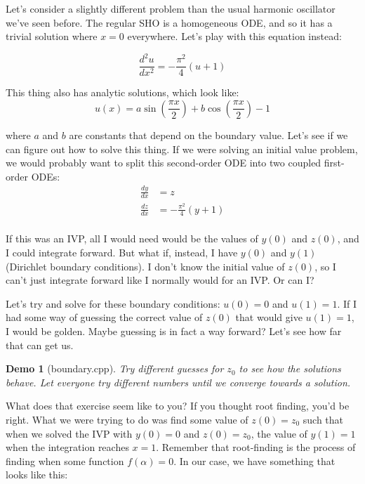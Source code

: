 \documentclass{article}
\theoremstyle{demo}
\newtheorem{demo}{Demo}[section]
\begin{document}
Let's consider a slightly different problem than the usual harmonic oscillator
we've seen before.  The regular SHO is a homogeneous ODE, and so it has a
trivial solution where $x=0$ everywhere.  Let's play with this equation instead:

\begin{equation}
    \frac{d^2 u}{dx^2} = -\frac{\pi^2}{4}(u + 1)
\end{equation}

This thing also has analytic solutions, which look like:
\begin{equation}
    u(x) = a\sin\left(\frac{\pi x}{2}\right) + b\cos\left(\frac{\pi x}{2}\right)
    -1
\end{equation}

where $a$ and $b$ are constants that depend on the boundary value.  Let's see if
we can figure out how to solve this thing.  If we were solving an initial value
problem, we would probably want to split this second-order ODE into two coupled
first-order ODEs:
\begin{equation}
    \begin{aligned}
        \frac{dy}{dx} &= z \\
        \frac{dz}{dx} &= -\frac{\pi^2}{4}(y+1) \\
    \end{aligned}
\end{equation}

If this was an IVP, all I would need would be the values of $y(0)$ and $z(0)$,
and I could integrate forward.  But what if, instead, I have $y(0)$ and $y(1)$
(Dirichlet boundary conditions).  I don't know the initial value of $z(0)$, so I
can't just integrate forward like I normally would for an IVP.  Or can I?

Let's try and solve for these boundary conditions: $u(0) = 0$ and $u(1) = 1$.
If I had some way of guessing the correct value of $z(0)$ that would give
$u(1)=1$, I would be golden.  Maybe guessing is in fact a way forward?  Let's
see how far that can get us.

\begin{demo}[boundary.cpp]
    Try different guesses for $z_0$ to see how the solutions behave.  Let
    everyone try different numbers until we converge towards a solution.
\end{demo}

What does that exercise seem like to you?  If you thought root finding, you'd be
right.  What we were trying to do was find some value of $z(0)= z_0$ such that when
we solved the IVP with $y(0)=0$ and $z(0)=z_0$, the value of $y(1)=1$ when the
integration reaches $x=1$.  Remember that root-finding is the process of finding
when some function $f(\alpha) = 0$.  In our case, we have something that looks
like this:
\end{document}
